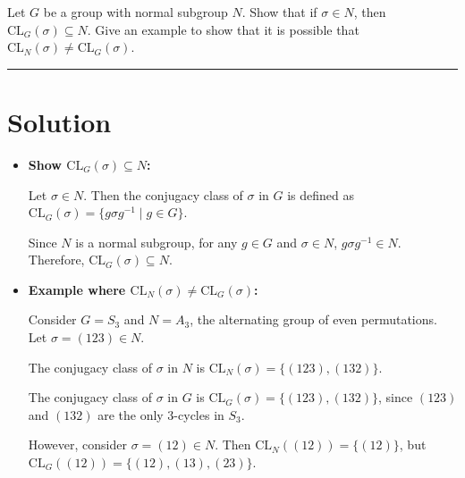 \documentclass[12pt]{amsart}
\theoremstyle{definition}
\numberwithin{equation}{section}
\begin{document}
\begin{exercise}{8} Let \(G\) be a group with normal subgroup \(N\). Show that if \(\sigma \in N\), then \(\text{CL}_G(\sigma) \subseteq N\). Give an example to show that it is possible that \(\text{CL}_N(\sigma) \neq \text{CL}_G(\sigma)\). 

    \noindent\rule{\linewidth}{1pt}

    \section*{Solution}
    
    \begin{itemize}
        \item \textbf{Show \(\text{CL}_G(\sigma) \subseteq N\):}
        
        Let \(\sigma \in N\). Then the conjugacy class of \(\sigma\) in \(G\) is defined as \(\text{CL}_G(\sigma) = \{g\sigma g^{-1} \mid g \in G\}\).
        
        Since \(N\) is a normal subgroup, for any \(g \in G\) and \(\sigma \in N\), \(g\sigma g^{-1} \in N\). Therefore, \(\text{CL}_G(\sigma) \subseteq N\).
        
        \item \textbf{Example where \(\text{CL}_N(\sigma) \neq \text{CL}_G(\sigma)\):}
        
        Consider \(G = S_3\) and \(N = A_3\), the alternating group of even permutations. Let \(\sigma = (123) \in N\).
        
        The conjugacy class of \(\sigma\) in \(N\) is \(\text{CL}_N(\sigma) = \{(123), (132)\}\).
        
        The conjugacy class of \(\sigma\) in \(G\) is \(\text{CL}_G(\sigma) = \{(123), (132)\}\), since \((123)\) and \((132)\) are the only 3-cycles in \(S_3\).
        
        However, consider \(\sigma = (12) \in N\). Then \(\text{CL}_N((12)) = \{(12)\}\), but \(\text{CL}_G((12)) = \{(12), (13), (23)\}\).
    \end{itemize}
    
\end{exercise}
\newpage
\end{document}
